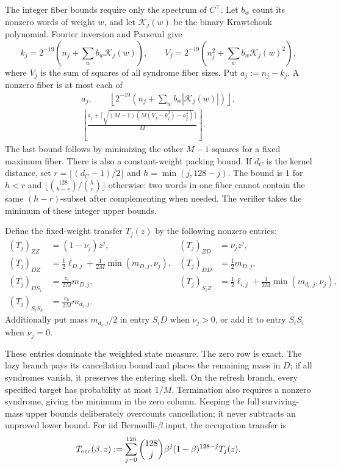 The integer fiber bounds require only the spectrum of $C^\top$. Let $b_w$
count its nonzero words of weight $w$, and let $\mathcal K_j(w)$ be the
binary Krawtchouk polynomial. Fourier inversion and Parseval give
\[
 k_j=2^{-19}\left(n_j+\sum_w b_w\mathcal K_j(w)\right),\qquad
 V_j=2^{-19}\left(n_j^2+\sum_w b_w\mathcal K_j(w)^2\right),
\]
where $V_j$ is the sum of squares of all syndrome fiber sizes. Put
$a_j:=n_j-k_j$. A nonzero fiber is at most each of
\begin{gather*}
 a_j,\qquad
 \left\lfloor2^{-19}\left(n_j+\sum_w b_w|\mathcal K_j(w)|\right)\right\rfloor,\\
 \left\lfloor\frac{a_j+\lceil\sqrt{(M-1)(M(V_j-k_j^2)-a_j^2)}\rceil}{M}\right\rfloor.
\end{gather*}
The last bound follows by minimizing the other $M-1$ squares for a fixed
maximum fiber. There is also a constant-weight packing bound. If $d_C$ is
the kernel distance, set $r=\lfloor(d_C-1)/2\rfloor$ and $h=\min(j,128-j)$.
The bound is $1$ for $h<r$ and
$\lfloor\binom{128}{h-r}/\binom hr\rfloor$ otherwise: two words in one
fiber cannot contain the same $(h-r)$-subset after complementing when needed.
The verifier takes the minimum of these integer upper bounds.

Define the fixed-weight transfer $T_j(z)$ by the following nonzero entries:
\begin{align*}
 (T_j)_{ZZ}&=(1-\nu_j)z^j,& (T_j)_{ZD}&=\nu_j z^j,\\
 (T_j)_{DZ}&=\tfrac12\ell_{D,j}+\tfrac1{2M}\min(m_{D,j},\nu_j),&
 (T_j)_{DD}&=\tfrac12m_{D,j},\\
 (T_j)_{DS_i}&=\tfrac{c_i}{2M}m_{D,j},&
 (T_j)_{S_iZ}&=\tfrac12\ell_{i,j}+\tfrac1{2M}\min(m_{d_i,j},\nu_j),\\
 (T_j)_{S_iS_h}&=\tfrac{c_h}{2M}m_{d_i,j}.&&
\end{align*}
Additionally put mass $m_{d_i,j}/2$ in entry $S_iD$ when $\nu_j>0$, or
add it to entry $S_iS_i$ when $\nu_j=0$.

These entries dominate the weighted state measure. The zero row is exact.
The lazy branch pays its cancellation bound and places the remaining mass
in $D$; if all syndromes vanish, it preserves the entering shell.
On the refresh branch, every specified target has probability at most $1/M$.
Termination also requires a nonzero syndrome, giving the minimum in the
zero column. Keeping the full surviving-mass upper bounds deliberately
overcounts cancellation; it never subtracts an unproved lower bound.
For iid Bernoulli-$\beta$ input, the occupation transfer is
\[
 T_{\rm occ}(\beta,z):=\sum_{j=0}^{128}
 \binom{128}{j}\beta^j(1-\beta)^{128-j}T_j(z).
\]

